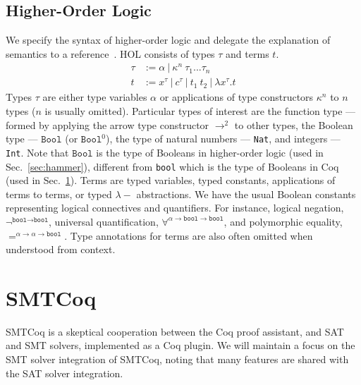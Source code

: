 \documentclass[11pt]{article}
\begin{document}
	\subsection{Higher-Order Logic}
	\label{sec:hol}
	We specify the 
	syntax of higher-order logic 
	and delegate the explanation of 
	semantics to a 
	reference~\cite{10.5555/155278}. 
	HOL consists of 
	types $\tau$ and terms $t$. 
	\begin{align*}
	\tau &:= \alpha\ |\ \kappa^n\ 
	\tau_1 ... \tau_n\\
	t &:= x^{\tau}\ |\ c^{\tau}\ |\ t_1\ t_2\ 
	|\ \lambda x^{\tau}.t
	\end{align*}	
	Types $\tau$ are either type
	variables $\alpha$ or 
	applications of type 
	constructors $\kappa^n$ to 
	$n$ types ($n$ is usually omitted). 
	Particular types of interest are 
	the function type --- formed by 
	applying the arrow type constructor 
	$\to^{2}$ to other types, the 
	Boolean type --- $\texttt{Bool}$ 
	(or $\texttt{Bool}^0$), the type of 
	natural numbers --- \texttt{Nat},
	and integers --- \texttt{Int}.
	Note that $\texttt{Bool}$ is the 
	type of Booleans in higher-order
	logic (used in 
	Sec.~\ref{sec:hammer}), different
	from \texttt{bool} which is the 
	type of Booleans in Coq (used 
	in Sec.~\ref{sec:smtcoq}).
	Terms are typed variables, 
	typed constants, applications 
	of terms to terms, or typed
	$\lambda-$ abstractions. We have
	the usual Boolean constants 
	representing logical connectives
	and quantifiers. For instance, 
	logical negation, 
	$\neg^{\texttt{bool} \to 
		\texttt{bool}}$, universal 
	quantification,
	$\forall^{\alpha \to 
		\texttt{bool} \to \texttt{bool}}$, 
	and polymorphic equality,
	$=^{\alpha \to \alpha 
		\to \texttt{bool}}$. Type 
	annotations for terms are also 
	often omitted when understood
	from context.
	
	
	\section{SMTCoq}
	\label{sec:smtcoq}
	SMTCoq is a skeptical cooperation 
	between the Coq proof assistant, and 
	SAT and SMT solvers, implemented as a 
	Coq plugin. We will maintain a focus 
	on the SMT solver integration of 
	SMTCoq, noting that many features are 
	shared with the SAT	solver integration.
	
\end{document}
